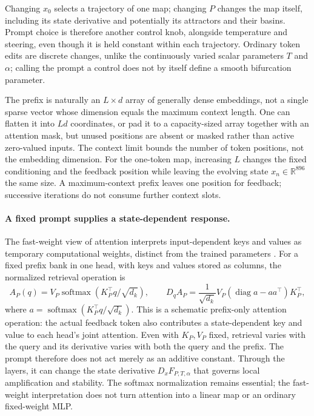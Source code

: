 \documentclass[11pt,letterpaper]{article}
\begin{document}
Changing $x_0$ selects a trajectory of one map; changing $P$ changes the map itself,
including its state derivative and potentially its attractors and their basins. Prompt
choice is therefore another control knob, alongside temperature and steering, even
though it is held constant within each trajectory. Ordinary token edits are discrete
changes, unlike the continuously varied scalar parameters $T$ and $\alpha$; calling the
prompt a control does not by itself define a smooth bifurcation parameter.

The prefix is naturally an $L\times d$ array of generally dense embeddings, not a
single sparse vector whose dimension equals the maximum context length. One can flatten
it into $Ld$ coordinates, or pad it to a capacity-sized array together with an attention
mask, but unused positions are absent or masked rather than active zero-valued inputs.
The context limit bounds the number of token positions, not the embedding dimension.
For the one-token map, increasing $L$ changes the fixed conditioning and the feedback
position while leaving the evolving state $x_n\in\mathbb{R}^{896}$ the same size. A
maximum-context prefix leaves one position for feedback; successive iterations do not
consume further context slots.

\paragraph{A fixed prompt supplies a state-dependent response.}
The fast-weight view of attention interprets input-dependent keys and values as
temporary computational weights, distinct from the trained parameters
\cite{wen2026mita}. For a fixed prefix bank in one head, with keys and values stored
as columns, the normalized retrieval operation is
\begin{equation}
 A_P(q)=V_P\operatorname{softmax}(K_P^{\top}q/\sqrt{d_k}),\qquad
 D_qA_P=\frac{1}{\sqrt{d_k}}V_P(\operatorname{diag}a-aa^{\top})K_P^{\top},
 \label{eq:prompt-attention}
\end{equation}
where $a=\operatorname{softmax}(K_P^{\top}q/\sqrt{d_k})$.
This is a schematic prefix-only attention operation: the actual feedback token
also contributes a state-dependent key and value to each head's joint attention.
Even with $K_P,V_P$ fixed, retrieval varies with the query and its derivative varies
with both the query and the prefix. The prompt therefore does not act merely as
an additive constant. Through the layers, it can change the state derivative
$D_xF_{P,T,\alpha}$ that governs local amplification and stability. The softmax
normalization remains essential; the fast-weight interpretation does not turn
attention into a linear map or an ordinary fixed-weight MLP.
\end{document}
